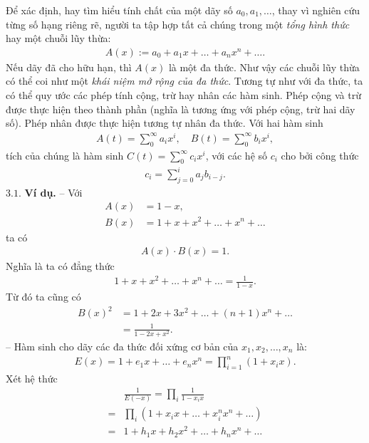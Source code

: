 \begin{multicols}{2}
	Để xác định, hay tìm hiểu tính chất của một dãy số $a_0,a_1,\ldots$, thay vì nghiên cứu từng số hạng riêng rẽ, người ta tập hợp tất cả chúng trong một { \em tổng hình thức} hay một chuỗi lũy thừa:
	\begin{align*}
		A(x):=a_0+a_1 x+\ldots+ a_nx^n+\ldots.
	\end{align*}
	Nếu dãy đã cho hữu hạn, thì $A(x)$ là một đa thức. Như vậy các chuỗi lũy thừa có thể coi như một \textit{ khái niệm mở rộng của đa thức}.
	\vskip 0.1cm
	Tương tự như với đa thức, ta có thể quy ước các phép tính cộng, trừ hay nhân các hàm sinh.   
	\vskip 0.1cm
	Phép cộng và trừ được thực hiện theo thành phần (nghĩa là tương ứng với phép cộng, trừ hai dãy số).
	\vskip 0.1cm
	Phép nhân được thực hiện tương tự nhân đa thức. Với hai hàm sinh
	\begin{align*}
		A(t)=\sum_0^\infty a_ix^i,\quad B(t)=\sum_0^\infty b_i x^i,
	\end{align*}
	tích của chúng là hàm sinh $C(t)=\sum_0^\infty c_ix^i$, với các hệ số $c_i$ cho bởi công thức
	\begin{align*}
		c_i=\sum_{j=0}^i a_jb_{i-j}.
	\end{align*}
	$\pmb{3.1.}$ \textbf{\color{hoccungpi}Ví dụ.}
	\vskip 0.1cm
	-- Với
	\begin{align*}
		A(x)&=1-x,\\
		B(x)&=1+x+x^2+\ldots+x^n+\ldots
	\end{align*}
	ta có 
	\begin{align*}
		A(x)\cdot B(x)=1.
	\end{align*}
	Nghĩa là ta có đẳng thức
	\begin{align*}
		1+x+x^2+\ldots+x^n+\ldots=\frac 1{1-x}.
	\end{align*}
	Từ đó ta cũng có
	\begin{align*}
		B(x)^2&=1+2x+3x^2+\ldots+(n+1)x^n+\ldots\\
		&=\frac1{1-2x+x^2}.
	\end{align*}
	-- Hàm sinh cho dãy  các đa thức đối xứng cơ bản của $x_1,x_2,\ldots,x_n$ là: 
	\begin{align*}
		E(x)=1+e_1x+\ldots +e_nx^n=\prod_{i=1}^n (1+x_ix).
	\end{align*}   
	Xét hệ thức
	\begin{align*}
		&\frac 1{E(-x)}=\prod_i \frac 1{1-x_ix}\\
		=&\prod_i (1+x_i x+\ldots+x_i^nx^n+\ldots)\nonumber \\
		=& 1+h_1x+h_2x^2+\ldots+h_nx^n+\ldots  \tag{$7$}
	\end{align*} 

\end{multicols}
